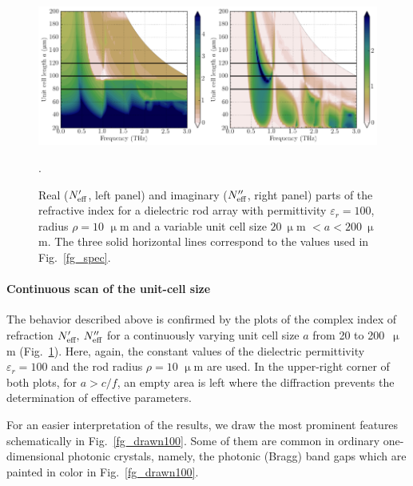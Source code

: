 \begin{figure}\centering  %
\includegraphics[width=0.5\textwidth]{img/ERods_eps100_spacingscan_Nim.pdf}\includegraphics[width=0.5\textwidth]{img/ERods_eps100_spacingscan_Nre.pdf}
\caption{Real ($N_{\text{eff} }'$, left panel) and imaginary ($N_{\text{eff} }''$, right panel) parts of the refractive index for a dielectric rod array with permittivity $\varepsilon_r =100$, radius $\rho = 10$ $\upmu$m and a variable unit cell size $20\:\upmu$m $<a<200\:\upmu$m.  The three solid horizontal lines correspond to the values used in Fig.~\ref{fg_spec}.}
\label{fg_spacingscan100}. 
\end{figure}

\paragraph{Continuous scan of the unit-cell size}%
The behavior described above is confirmed by the plots of the complex index of refraction $N_{\text{eff} }',\: N_{\text{eff} }''$ for a continuously varying unit cell size $a$ from 20 to 200~$\upmu$m (Fig.~\ref{fg_spacingscan100}). Here, again, the constant values of the dielectric permittivity $\varepsilon_r=100$ and the rod radius $\rho=10$ $\upmu$m are used. In the upper-right corner of both plots, for $a>c/f$, an empty area is left where the diffraction prevents the determination of effective parameters. 

For an easier interpretation of the results, we draw the most prominent features schematically in Fig.~\ref{fg_drawn100}. Some of them are common in ordinary one-dimensional photonic crystals, namely, the photonic (Bragg) band gaps which are painted in color in Fig.~\ref{fg_drawn100}.


